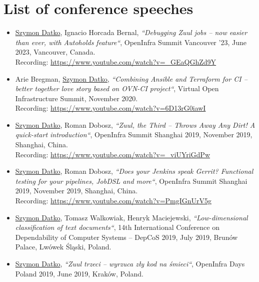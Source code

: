 \section{List of conference speeches}

\begin{itemize}
    \item
        \underline{Szymon Datko}, Ignacio Horcada Bernal,
        \textit{“Debugging Zuul jobs – now easier than ever, with Autoholds feature“},
        OpenInfra Summit Vancouver '23,
        June 2023, Vancouver, Canada.\\
        Recording: \url{https://www.youtube.com/watch?v=_GEaQGhZd9Y}

    \item
        Arie Bregman, \underline{Szymon Datko},
        \textit{“Combining Ansible and Terraform for CI – better together love story based on OVN-CI project“},
        Virtual Open Infrastructure Summit,
        November 2020.\\
        Recording: \url{https://www.youtube.com/watch?v=6D13rG0iawI}

    \item
        \underline{Szymon Datko}, Roman Dobosz,
        \textit{“Zuul, the Third – Throws Away Any Dirt! A quick-start introduction“},
        OpenInfra Summit Shanghai 2019,
        November 2019, Shanghai, China.\\
        Recording: \url{https://www.youtube.com/watch?v=_viUYriGdPw}

    \item
        \underline{Szymon Datko}, Roman Dobosz,
        \textit{“Does your Jenkins speak Gerrit? Functional testing for your pipelines, JobDSL and more“},
        OpenInfra Summit Shanghai 2019,
        November 2019, Shanghai, China.\\
        Recording: \url{https://www.youtube.com/watch?v=PmgIGnUrV5g}

    \item
        \underline{Szymon Datko}, Tomasz Walkowiak, Henryk Maciejewski,
        \textit{“Low-dimensional classification of text documents“},
        14th International Conference on Dependability of Computer Systems – DepCoS 2019,
        July 2019, Brunów Palace, Lwówek Śląski, Poland.

    \item
        \underline{Szymon Datko},
        \textit{“Zuul trzeci – wyrzuca zły kod na śmieci“},
        OpenInfra Days Poland 2019,
        June 2019, Kraków, Poland.


\end{itemize}
